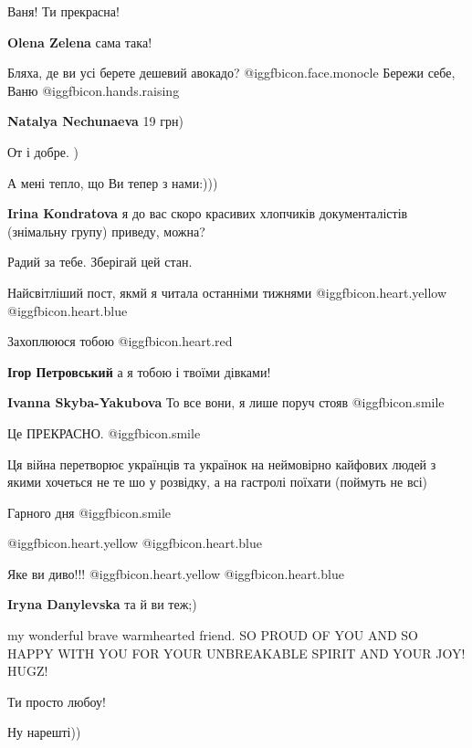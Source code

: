 \begin{itemize}
Ваня! Ти прекрасна!

\textbf{Olena Zelena} сама така!

Бляха, де ви усі берете дешевий авокадо? @igg{fbicon.face.monocle}  Бережи себе, Ваню @igg{fbicon.hands.raising} 

\textbf{Natalya Nechunaeva} 19 грн)

От і добре. )

А мені тепло, що Ви тепер з нами:)))

\textbf{Irina Kondratova} я до вас скоро красивих хлопчиків документалістів (знімальну групу) приведу, можна?

Радий за тебе. Зберігай цей стан.

Найсвітліший пост, якмй я читала останніми тижнями  @igg{fbicon.heart.yellow}  @igg{fbicon.heart.blue} 

Захоплююся тобою @igg{fbicon.heart.red}

\textbf{Ігор Петровський} а я тобою і твоїми дівками!

\textbf{Ivanna Skyba-Yakubova} То все вони, я лише поруч стояв  @igg{fbicon.smile} 


Це ПРЕКРАСНО.  @igg{fbicon.smile} 

Ця війна перетворює українців та українок на неймовірно кайфових людей з якими
хочеться не те шо у розвідку, а на гастролі поїхати (поймуть не всі)

Гарного дня  @igg{fbicon.smile} 

 @igg{fbicon.heart.yellow}  @igg{fbicon.heart.blue} 

Яке ви диво!!! @igg{fbicon.heart.yellow}  @igg{fbicon.heart.blue} 

\textbf{Iryna Danylevska} та й ви теж;)


my wonderful brave warmhearted friend. SO PROUD OF YOU AND SO HAPPY WITH YOU
FOR YOUR UNBREAKABLE SPIRIT AND YOUR JOY! HUGZ!

Ти просто любоу!

Ну нарешті))


\end{itemize}
